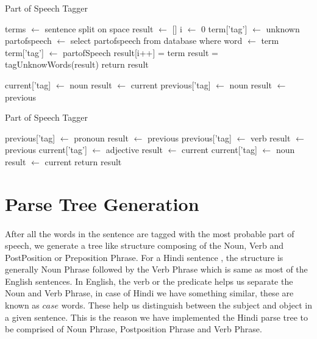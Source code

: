 \begin{algorithm}
\caption{Part of Speech Tagger}\label{alg:brilltaggervariant}
\begin{algorithmic}[1]
\State terms $\gets$ sentence split on space 
\State result $\gets$ []
\State i $\gets$ 0
\State term['tag'] $\gets$ unknown
\State partofspeech $\gets$ select partofspeech from database where word $\gets$ term
\State term['tag'] $\gets$ partofSpeech 
\EndIf
\State result[i++] = term
\EndFor
\State result = tagUnknowWords(result)
\State return result
\EndProcedure

\State current['tag] $\gets$ noun
\State result $\gets$ current
\EndIf
{}
\State previous['tag] $\gets$ noun
\State result $\gets$ previous
\EndIf		
{}		
\end{algorithmic}
\end{algorithm}
\begin{algorithm}
\caption{Part of Speech Tagger}\label{alg:brilltaggervariant}              
\begin{algorithmic}                 
\State previous['tag] $\gets$ pronoun
\State result $\gets$ previous
\EndIf
{}
\State previous['tag] $\gets$ verb
\State result $\gets$ previous
\EndIf
{}
\State current['tag'] $\gets$ adjective
\State result $\gets$ current
\EndIf
{}
\State  current['tag] $\gets$ noun
\State result $\gets$ current
\EndIf
\EndFor
\State return result
\EndProcedure
\end{algorithmic}
\end{algorithm}
\break

\section {Parse Tree Generation}
\paragraph{}
After all the words in the sentence are tagged with the most probable part of speech, we generate a tree like structure composing of the Noun, Verb and PostPosition or Preposition Phrase. For a Hindi sentence \cite{bhat2017improving}, the structure is generally Noun Phrase followed by the Verb Phrase which is same as most of the English sentences. In English, the verb or the predicate helps us separate the Noun and Verb Phrase, in case of Hindi we have something similar, these are known as $case$ words. These help us distinguish between the subject and object in a given sentence. This is the reason we have implemented the Hindi parse tree to be comprised of Noun Phrase, Postposition Phrase and Verb Phrase. 

